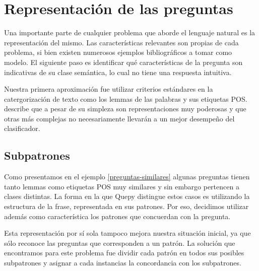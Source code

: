 \chapter{Representación de las preguntas}

Una importante parte de cualquier problema que aborde el lenguaje natural es la representación del mismo. Las características relevantes son propias de cada problema, si bien existen numerosos ejemplos bibliográficos a tomar como modelo. El siguiente paso es identificar qué características de la pregunta son indicativas de su clase semántica, lo cual no tiene una respuesta intuitiva.

Nuestra primera aproximación fue utilizar criterios estándares en la catergorización de texto como los lemmas de las palabras y sus etiquetas POS. \citet{Sebastiani-text-categorization} describe que a pesar de su simpleza son representaciones muy poderosas y que otras más complejas no necesariamente llevarán a un mejor desempeño del clasificador.

\section{Subpatrones}

Como presentamos en el ejemplo \ref{preguntas-similares} algunas preguntas tienen tanto lemmas como etiquetas POS muy similares y sin embargo pertencen a clases distintas. La forma en la que Quepy distingue estos casos es utilizando la estructura de la frase, representada en sus patrones. Por eso, decidimos utilizar además como característica los patrones que concuerdan con la pregunta.

Esta representación por sí sola tampoco mejora nuestra situación inicial, ya que sólo reconoce las preguntas que corresponden a un patrón. La solución que encontramos para este problema fue dividir cada patrón en todos sus posibles subpatrones y asignar a cada instancias la concordancia con los subpatrones.

